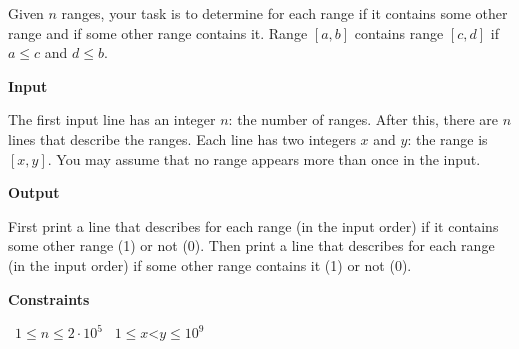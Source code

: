 Given $n$ ranges, your task is to determine for each range if it contains some other range and if some other range contains it.
Range $[a,b]$ contains range $[c,d]$ if $a \le c$ and $d \le b$.

\vspace{0.3cm}\noindent\textbf{Input}

The first input line has an integer $n$: the number of ranges.
After this, there are $n$ lines that describe the ranges. Each line has two integers $x$ and $y$: the range is $[x,y]$.
You may assume that no range appears more than once in the input.

\vspace{0.3cm}\noindent\textbf{Output}

First print a line that describes for each range (in the input order) if it contains some other range (1) or not (0).
Then print a line that describes for each range (in the input order) if some other range contains it (1) or not (0).

\vspace{0.3cm}\noindent\textbf{Constraints}

\textbullet\ $1 \le n \le 2 \cdot 10^5$
\textbullet\ $1 \le x $<$ y \le 10^9$